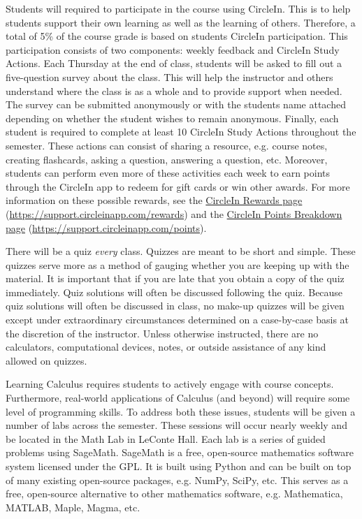 \documentclass[11pt,letterpaper]{article}
\begin{document}
Students will required to participate in the course using CircleIn. This is to help students support their own learning as well as the learning of others. Therefore, a total of 5\% of the course grade is based on students CircleIn participation. This participation consists of two components: weekly feedback and CircleIn Study Actions. Each Thursday at the end of class, students will be asked to fill out a five-question survey about the class. This will help the instructor and others understand where the class is as a whole and to provide support when needed. The survey can be submitted anonymously or with the students name attached depending on whether the student wishes to remain anonymous. Finally, each student is required to complete at least 10 CircleIn Study Actions throughout the semester. These actions can consist of sharing a resource, e.g. course notes, creating flashcards, asking a question, answering a question, etc. Moreover, students can perform even more of these activities each week to earn points through the CircleIn app to redeem for gift cards or win other awards. For more information on these possible rewards, see the \href{https://support.circleinapp.com/rewards}{CircleIn Rewards page} (\url{https://support.circleinapp.com/rewards}) and the \href{https://support.circleinapp.com/points}{CircleIn Points Breakdown page} (\url{https://support.circleinapp.com/points}). 
\sectionbreak




There will be a quiz \textit{every} class. Quizzes are meant to be short and simple. These quizzes serve more as a method of gauging whether you are keeping up with the material. It is important that if you are late that you obtain a copy of the quiz immediately. Quiz solutions will often be discussed following the quiz. Because quiz solutions will often be discussed in class, no make-up quizzes will be given except under extraordinary circumstances determined on a case-by-case basis at the discretion of the instructor. Unless otherwise instructed, there are no calculators, computational devices, notes, or outside assistance of any kind allowed on quizzes. 
\sectionbreak





\newpage





Learning Calculus requires students to actively engage with course concepts. Furthermore, real-world applications of Calculus (and beyond) will require some level of programming skills. To address both these issues, students will be given a number of labs across the semester. These sessions will occur nearly weekly and be located in the Math Lab in LeConte Hall. Each lab is a series of guided problems using SageMath. SageMath is a free, open-source mathematics software system licensed under the GPL. It is built using Python and can be built on top of many existing open-source packages, e.g. NumPy, SciPy, etc. This serves as a free, open-source alternative to other mathematics software, e.g. Mathematica, MATLAB, Maple, Magma, etc. \pspace
\end{document}
